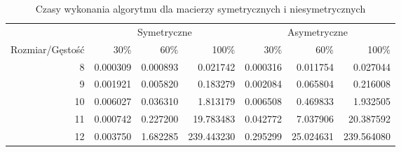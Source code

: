 \begin{table}[h!]
\begin{tabular}{rrrrrrr}
\toprule
 & \multicolumn{3}{c}{Symetryczne} & \multicolumn{3}{c}{Asymetryczne} \\
Rozmiar/Gęstość & 30\% & 60\% & 100\% & 30\% & 60\% & 100\% \\
\midrule
8 & 0.000309 & 0.000893 & 0.021742 & 0.000316 & 0.011754 & 0.027044 \\
9 & 0.001921 & 0.005820 & 0.183279 & 0.002084 & 0.065804 & 0.216008 \\
10 & 0.006027 & 0.036310 & 1.813179 & 0.006508 & 0.469833 & 1.932505 \\
11 & 0.000742 & 0.227200 & 19.783483 & 0.042772 & 7.037906 & 20.387592 \\
12 & 0.003750 & 1.682285 & 239.443230 & 0.295299 & 25.024631 & 239.564080 \\
\bottomrule
\end{tabular} 
\caption{Czasy wykonania algorytmu dla macierzy symetrycznych i niesymetrycznych}
\label{tab:mean_time_bfsresoult.csv}
\end{table}

